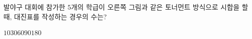\hspace*{2mm}\begin{minipage}[t]{\dimexpr\linewidth-2mm\relax}\vspace{0pt}
\noindent\begin{minipage}[t]{0.58\linewidth}\vspace{0pt}\raggedright 발야구 대회에 참가한 $5$개의 학급이 오른쪽 그림과 같은 토너먼트 방식으로 시합을 할 때, 대진표를 작성하는 경우의 수는?\end{minipage}\hfill\begin{minipage}[t]{0.4\linewidth}\vspace{0pt}\centering \resizebox{\ifdim\width>\linewidth\linewidth\else\width\fi}{!}{}\end{minipage}\par
\begin{choices32}{$10$}{$30$}{$60$}{$90$}{$180$}\end{choices32}\end{minipage}
